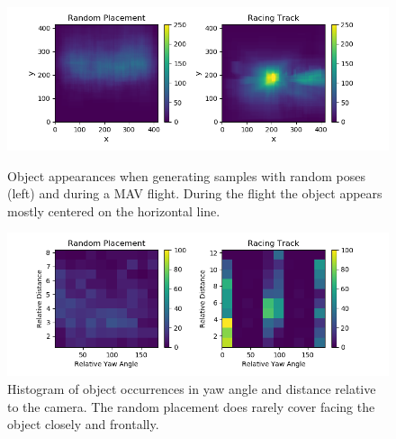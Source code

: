\begin{figure}
	\begin{minipage}{\textwidth}
		\includegraphics[width=\textwidth]{fig/heatmap_camplace}
		\caption{Object appearances when generating samples with random poses (left) and during a \ac{MAV} flight. During the flight the object appears mostly centered on the horizontal line.}
		\label{fig:heatmap_camplace}
	\end{minipage}
	\begin{minipage}{\textwidth}
		\includegraphics[width=\textwidth]{fig/hist2d_camplace}
		\caption{Histogram of object occurrences in yaw angle and distance relative to the camera. The random placement does rarely cover facing the object closely and frontally. }
		\label{fig:hist2d_camplace}
	\end{minipage}
\end{figure}

